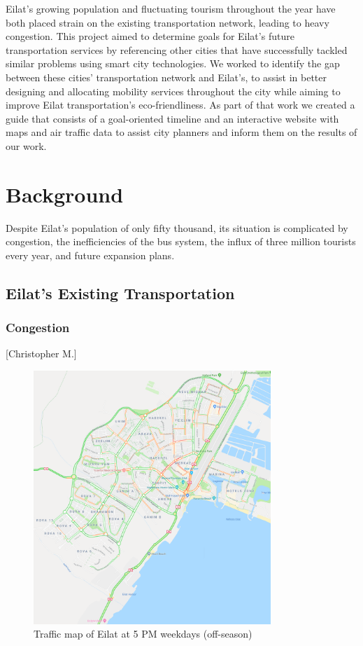 \documentclass[12pt]{article}                               %
\begin{document}
Eilat's growing population and fluctuating tourism throughout the year have both placed strain on the existing transportation network, leading to heavy congestion. This project aimed to determine goals for Eilat's future transportation services by referencing other cities that have successfully tackled similar problems using smart city technologies. We worked to identify the gap between these cities' transportation network and Eilat's, to assist in better designing and allocating mobility services throughout the city while aiming to improve Eilat transportation's eco-friendliness. As part of that work we created a guide that consists of a goal-oriented timeline and an interactive website with maps and air traffic data to assist city planners and inform them on the results of our work.
 
\newpage
\section{Background}
Despite Eilat's population of only fifty thousand, its situation is complicated by congestion, the inefficiencies of the bus system, the influx of three million tourists every year, and future expansion plans.

\subsection{Eilat's Existing Transportation}
\subsubsection{Congestion}[Christopher M.]

\begin{figure}[H]
    \centering
    \includegraphics[width=0.8\textwidth]{images/eilat_traffic.png}
    \caption{Traffic map of Eilat at 5 PM weekdays (off-season)}
    \label{img:eilatTraffic}
\end{figure}
\end{document}
